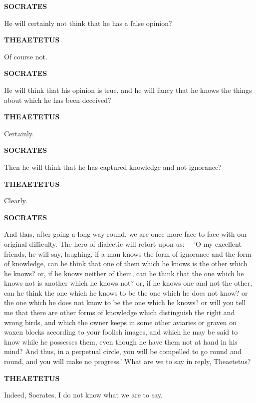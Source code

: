 \documentclass[11pt,letter]{article}
\begin{document}
\par \textbf{SOCRATES}
\par   He will certainly not think that he has a false opinion?

\par \textbf{THEAETETUS}
\par   Of course not.

\par \textbf{SOCRATES}
\par   He will think that his opinion is true, and he will fancy that he knows the things about which he has been deceived?

\par \textbf{THEAETETUS}
\par   Certainly.

\par \textbf{SOCRATES}
\par   Then he will think that he has captured knowledge and not ignorance?

\par \textbf{THEAETETUS}
\par   Clearly.

\par \textbf{SOCRATES}
\par   And thus, after going a long way round, we are once more face to face with our original difficulty. The hero of dialectic will retort upon us: —'O my excellent friends, he will say, laughing, if a man knows the form of ignorance and the form of knowledge, can he think that one of them which he knows is the other which he knows? or, if he knows neither of them, can he think that the one which he knows not is another which he knows not? or, if he knows one and not the other, can he think the one which he knows to be the one which he does not know? or the one which he does not know to be the one which he knows? or will you tell me that there are other forms of knowledge which distinguish the right and wrong birds, and which the owner keeps in some other aviaries or graven on waxen blocks according to your foolish images, and which he may be said to know while he possesses them, even though he have them not at hand in his mind? And thus, in a perpetual circle, you will be compelled to go round and round, and you will make no progress.' What are we to say in reply, Theaetetus?

\par \textbf{THEAETETUS}
\par   Indeed, Socrates, I do not know what we are to say.
\end{document}
